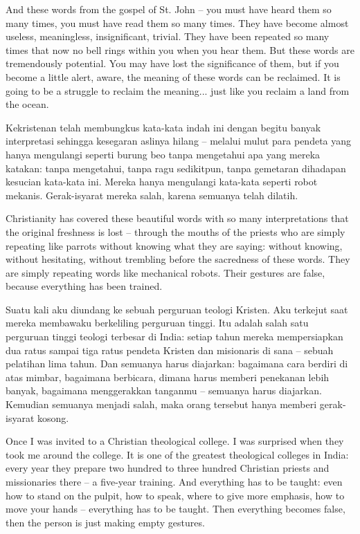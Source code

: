\english
And these words from the gospel of St. John -- you must have heard them so many times, you must have read them so many times. They have become almost useless, meaningless, insignificant, trivial. They have been repeated so many times that now no bell rings within you when you hear them. But these words are tremendously potential. You may have lost the significance of them, but if you become a little alert, aware, the meaning of these words can be reclaimed. It is going to be a struggle to reclaim the meaning... just like you reclaim a land from the ocean.

\bahasa
Kekristenan telah membungkus kata-kata indah ini dengan begitu banyak interpretasi sehingga kesegaran aslinya hilang -- melalui mulut para pendeta yang hanya mengulangi seperti burung beo tanpa mengetahui apa yang mereka katakan: tanpa mengetahui, tanpa ragu sedikitpun, tanpa gemetaran dihadapan kesucian kata-kata ini. Mereka hanya mengulangi kata-kata seperti robot mekanis. Gerak-isyarat mereka salah, karena semuanya telah dilatih.

\english
Christianity has covered these beautiful words with so many interpretations that the original freshness is lost -- through the mouths of the priests who are simply repeating like parrots without knowing what they are saying: without knowing, without hesitating, without trembling before the sacredness of these words. They are simply repeating words like mechanical robots. Their gestures are false, because everything has been trained.

\bahasa
Suatu kali aku diundang ke sebuah perguruan teologi Kristen. Aku terkejut saat mereka membawaku berkeliling perguruan tinggi. Itu adalah salah satu perguruan tinggi teologi terbesar di India: setiap tahun mereka mempersiapkan dua ratus sampai tiga ratus pendeta Kristen dan misionaris di sana -- sebuah pelatihan lima tahun. Dan semuanya harus diajarkan: bagaimana cara berdiri di atas mimbar, bagaimana berbicara, dimana harus memberi penekanan lebih banyak, bagaimana menggerakkan tanganmu -- semuanya harus diajarkan. Kemudian semuanya menjadi salah, maka orang tersebut hanya memberi gerak-isyarat kosong.

\english
Once I was invited to a Christian theological college. I was surprised when they took me around the college. It is one of the greatest theological colleges in India: every year they prepare two hundred to three hundred Christian priests and missionaries there -- a five-year training. And everything has to be taught: even how to stand on the pulpit, how to speak, where to give more emphasis, how to move your hands -- everything has to be taught. Then everything becomes false, then the person is just making empty gestures.

